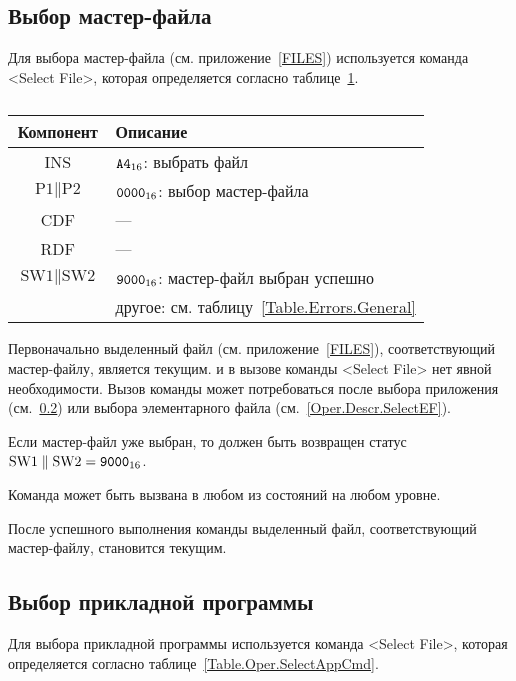 \subsection{Выбор мастер-файла}
\label{Oper.Descr.SelectMF}

Для выбора мастер-файла (см. приложение~\ref{FILES}) 
используется команда <Select File>, 
которая определяется согласно 
таблице~\ref{Table.Oper.SelectMFCmd}.

\begin{table}[hbt]
\caption{}\label{Table.Oper.SelectMFCmd}
\begin{tabular}{|c|p{14cm}|}
\hline
Компонент & Описание \\
\hline
\hline
INS & $\texttt{A4}_{16}$: выбрать файл\\ 
\hline
$\text{P1} \parallel \text{P2}$ & $\texttt{0000}_{16}$: выбор мастер-файла\\
\hline
CDF & --- \\
\hline 
RDF &  --- \\
\hline
$\text{SW1}\parallel\text{SW2}$ & 
$\texttt{9000}_{16}$: мастер-файл выбран успешно \\
  & другое: см. таблицу~\ref{Table.Errors.General} \\
\hline
\end{tabular}
\end{table}

Первоначально выделенный файл (см. приложение~\ref{FILES}), 
соответствующий мастер-файлу, является текущим.
и в вызове команды <Select File> нет явной необходимости. 
Вызов команды может потребоваться после 
выбора приложения (см.~\ref{Oper.Descr.SelectApp})
или выбора элементарного файла (см.~\ref{Oper.Descr.SelectEF}). 

Если мастер-файл уже выбран, то должен быть возвращен 
статус $\text{SW1} \parallel \text{SW2} = \texttt{9000}_{16}$.

Команда может быть вызвана в любом из состояний на 
любом уровне.

После успешного выполнения команды выделенный файл, 
соответствующий мастер-файлу, становится текущим.


\subsection{Выбор прикладной программы}
\label{Oper.Descr.SelectApp}

Для выбора прикладной программы используется 
команда <Select File>, 
которая определяется согласно 
таблице~\ref{Table.Oper.SelectAppCmd}.

